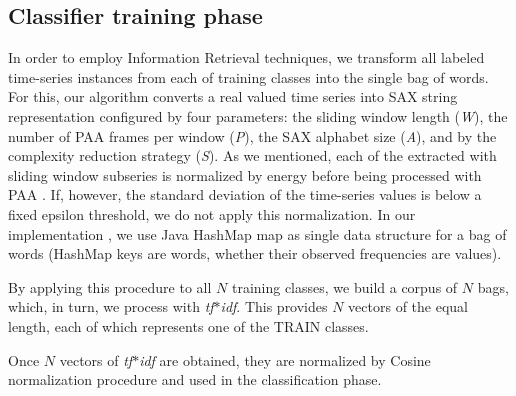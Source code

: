 \documentclass{llncs}
\begin{document}
\subsection{Classifier training phase}
In order to employ Information Retrieval techniques, we transform all labeled time-series instances
from each of training classes into the single bag of words. For this, our algorithm converts a real
valued time series into SAX string representation configured by four parameters: the sliding window
length (\textit{W}), the number of PAA frames per window (\textit{P}), the SAX alphabet size
(\textit{A}), and by the complexity reduction strategy (\textit{S}). 
As we mentioned, each of the extracted with sliding window subseries is normalized by energy before
being processed with PAA \cite{goldin_kanellakis}. If, however, the standard deviation of the
time-series values is below a fixed epsilon threshold, we do not apply this normalization.
In our implementation \cite{jmotif}, we use Java HashMap map as single data structure for a bag
of words (HashMap keys are words, whether their observed frequencies are values).

By applying this procedure to all $N$ training classes, we build a corpus of $N$ bags, which, in
turn, we process with \textit{tf$\ast$idf}. This provides $N$ vectors of the equal length, each of
which represents one of the TRAIN classes.

Once $N$ vectors of \textit{tf$\ast$idf} are obtained, they are normalized by Cosine
normalization procedure and used in the classification phase.
\end{document}
